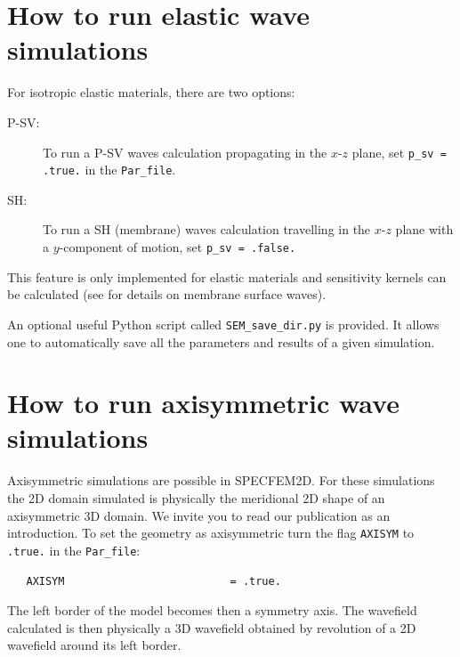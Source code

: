 \section{How to run elastic wave simulations}

For isotropic elastic materials, there are two options:
%
\begin{description}
\item[P-SV:]
To run a P-SV waves calculation propagating in the $x$-$z$ plane,
set \texttt{p\_sv = .true.} in the \texttt{Par\_file}.

\item[SH:]
To run a SH (membrane) waves calculation travelling in the $x$-$z$ plane with a
$y$-component of motion, set \texttt{p\_sv = .false.}

\end{description}
%
This feature is only implemented for elastic materials and sensitivity kernels
can be calculated (see \cite{TaLiTr07} for details on membrane
surface waves).

An optional useful Python script called \texttt{SEM\_save\_dir.py} is provided.
It allows one to automatically save all the parameters and results of a given simulation.


\section{How to run axisymmetric wave simulations}
\label{sec:axisym}
Axisymmetric simulations are possible in SPECFEM2D. For these simulations the 2D domain simulated is physically the meridional 2D shape of an axisymmetric 3D domain.
We invite you to read our publication \citep{BoCrKoAs16} as an introduction.
To set the geometry as axisymmetric turn the flag \texttt{AXISYM} to \texttt{.true.} in the \texttt{Par\_file}:
\begin{verbatim}
   AXISYM                          = .true.
\end{verbatim}
The left border of the model becomes then a symmetry axis. The wavefield calculated is then physically a 3D wavefield obtained by revolution of a 2D wavefield
around its left border.\newline


